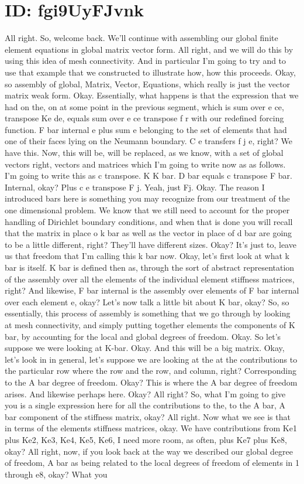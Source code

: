 \documentclass[10pt]{article}
\begin{document}
\section*{ID: fgi9UyFJvnk}
All right. So, welcome back. We'll continue with assembling our global finite element equations in global matrix vector form. All right, and we will do this by using this idea of mesh connectivity. And in particular I'm going to try and to use that example that we constructed to illustrate how, how this proceeds. Okay, so assembly of global, Matrix, Vector, Equations, which really is just the vector matrix weak form. Okay. Essentially, what happens is that the expression that we had on the, on at some point in the previous segment, which is sum over e ce, transpose Ke de, equals sum over e ce transpose f r with our redefined forcing function. F bar internal e plus sum e belonging to the set of elements that had one of their faces lying on the Neumann boundary. C e transfers f j e, right? We have this. Now, this will be, will be replaced, as we know, with a set of global vectors right, vectors and matrices which I'm going to write now as as follows. I'm going to write this as c transpose. K K bar.  D bar equals c transpose F bar. Internal, okay? Plus c e transpose F j. Yeah, just Fj. Okay. The reason I introduced bars here is something you may recognize from our treatment of the one dimensional problem. We know that we still need to account for the proper handling of Dirichlet boundary conditions, and when that is done you will recall that the matrix in place o k bar as well as the vector in place of d bar are going to be a little different, right? They'll have different sizes. Okay? It's just to, leave us that freedom that I'm calling this k bar now. Okay, let's first look at what k bar is itself. K bar is defined then as, through the sort of abstract representation of the assembly over all the elements of the individual element stiffness matrices, right? And likewise, F bar internal is the assembly over elements of F bar internal over each element e, okay? Let's now talk a little bit about K bar, okay? So, so essentially, this process of assembly is something that we go through by looking at mesh connectivity, and simply putting together elements the components of K bar, by accounting for the local and global degrees of freedom. Okay. So let's suppose we were looking at K-bar. Okay. And this will be a big matrix. Okay, let's look in in general, let's suppose we are looking at the at the contributions to the particular row where the row and the row, and column, right? Corresponding to the A bar degree of freedom. Okay? This is where the A bar degree of freedom arises. And likewise perhaps here. Okay? All right? So, what I'm going to give you is a single expression here for all the contributions to the, to the A bar, A bar component of the stiffness matrix, okay? All right. Now what we see is that in terms of the elements stiffness matrices, okay. We have contributions from Ke1 plus Ke2, Ke3, Ke4, Ke5, Ke6, I need more room, as often, plus Ke7 plus Ke8, okay? All right, now, if you look back at the way we described our global degree of freedom, A bar as being related to the local degrees of freedom of elements in 1 through e8, okay? What you 
\end{document}
